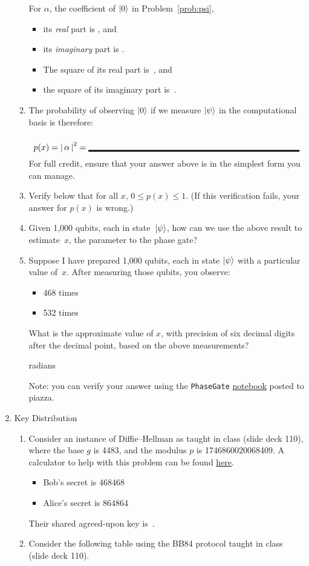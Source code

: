 \documentclass[12pt]{article}
\begin{document}
\begin{enumerate}
\begin{enumerate}[label=\theenumi.\arabic*]
  For $\alpha$, the coefficient of $\ket{0}$ in Problem~\ref{prob:psi},
  \begin{itemize}
      \item its \emph{real} part is \Blank[20em]{}, and
      \item its \emph{imaginary} part is \Blank[20em]{}.
      \item The square of its real part is~\Blank[20em]{}, and
      \item the square of its imaginary part is~\Blank[20em]{}.
  \end{itemize}
  \item\label{prob:prob} The probability of observing $\ket{0}$ if we measure $\ket{\psi}$ in the computational basis is therefore:
  \[
  p(x) = \Prob{\alpha} = \Blank[25em]{}
  \]
  For full credit, ensure that your answer above is in the simplest form you can manage.
  \item{} Verify below that for all $x$, $0 \leq p(x) \leq 1$.  (If this verification fails, your answer for $p(x)$ is wrong.)
  \LeaveSpace{}
  \item{} Given 1,000 qubits, each in state~$\ket{\psi}$, how can we use the above result to estimate~$x$, the parameter to the phase gate?
  \LeaveSpace{}
  \item{} Suppose I have prepared 1,000 qubits, each in state $\ket{\psi}$ with a particular value of~$x$. After measuring those qubits, you observe:
  \begin{itemize}
      \item \QZero{} 468 times
      \item \QOne{} 532 times
  \end{itemize}
  What is the approximate value of $x$, with precision of six decimal digits after the decimal point, based on the above measurements?
  
  \Blank[15em]{} radians

  Note: you can verify your answer using the \texttt{PhaseGate} \href{https://piazza.com/class/m5mjpzl3hch1cf/post/76}{notebook} posted to piazza.
\end{enumerate}
\item {} Key Distribution
\begin{enumerate}[label=\theenumi.\arabic*]
    \item{} Consider an instance of Diffie--Hellman as taught in class (slide deck 110), where the base $g$ is 4483, and the modulus $p$ is 1746860020068409.  A calculator to help with this problem can be found \href{https://www.boxentriq.com/code-breaking/modular-exponentiation}{here}.
    \begin{itemize}
        \item Bob's secret is 468468
        \item Alice's secret is 864864
    \end{itemize}
    Their shared agreed-upon key is~\Blank[20em]{}.
    \item{} Consider the following table using the BB84 protocol taught in class (slide deck 110).


\end{enumerate}
\end{enumerate}
\end{document}
